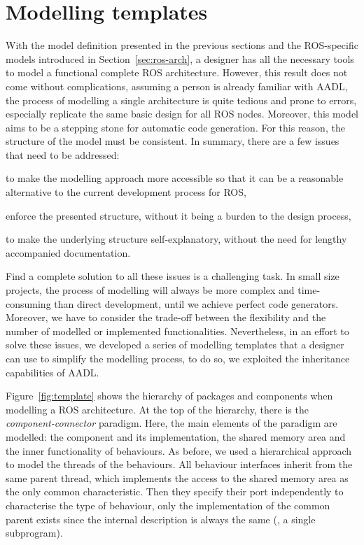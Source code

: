 \section{Modelling templates}
\label{sec:template}
With the model definition presented in the previous sections and the ROS-specific models introduced in Section~\ref{sec:ros-arch}, a designer has all the necessary tools to model a functional complete ROS architecture. However, this result does not come without complications, assuming a person is already familiar with AADL, the process of modelling a single architecture is quite tedious and prone to errors, especially replicate the same basic design for all ROS nodes. Moreover, this model aims to be a stepping stone for automatic code generation. For this reason, the structure of the model must be consistent. In summary, there are a few issues that need to be addressed:
\begin{enumerate*}[label={\alph*)}]
\item to make the modelling approach more accessible so that it can be a reasonable alternative to the current development process for ROS,
\item enforce the presented structure, without it being a burden to the design process,
\item to make the underlying structure self-explanatory, without the need for lengthy accompanied documentation.
\end{enumerate*}

Find a complete solution to all these issues is a challenging task. In small size projects, the process of modelling will always be more complex and time-consuming than direct development, until we achieve perfect code generators.  Moreover, we have to consider the trade-off between the flexibility and the number of modelled or implemented functionalities. Nevertheless, in an effort to solve these issues, we developed a series of modelling templates that a designer can use to simplify the modelling process, to do so, we exploited the inheritance capabilities of AADL.

Figure~\ref{fig:template} shows the hierarchy of packages and components when modelling a ROS architecture. At the top of the hierarchy, there is the \textit{component-connector} paradigm. Here, the main elements of the paradigm are modelled: the component and its implementation, the shared memory area and the inner functionality of behaviours. As before, we used a hierarchical approach to model the threads of the behaviours. All behaviour interfaces inherit from the same parent thread, which implements the access to the shared memory area as the only common characteristic. Then they specify their port independently to characterise the type of behaviour, only the implementation of the common parent exists since the internal description is always the same (\ie, a single subprogram).

